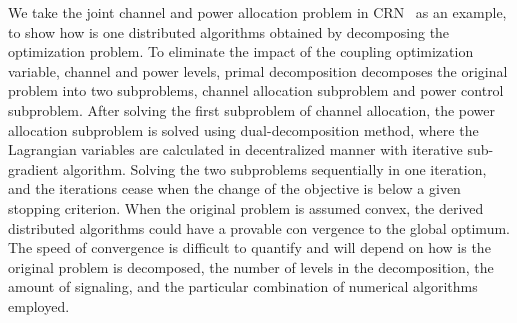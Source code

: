 We take the joint channel and power allocation problem in CRN~\cite{tachwali_opt_bandwidth_power_2013} as an example, to show how is one distributed algorithms obtained by decomposing the optimization problem.
To eliminate the impact of the coupling optimization variable, \ie channel and power levels, primal decomposition decomposes the original problem into two subproblems, channel allocation subproblem and power control subproblem. 
After solving the first subproblem of channel allocation, the power allocation subproblem is solved using dual-decomposition method, where the Lagrangian variables are calculated in decentralized manner with iterative sub-gradient algorithm.
Solving the two subproblems sequentially in one iteration, and the iterations cease when the change of the objective is below a given stopping criterion.
When the original problem is assumed convex, the derived distributed algorithms could have a provable con vergence to the global optimum.
The speed of convergence is difficult to quantify and will depend on how is the original problem is decomposed, \ie the number of levels in the decomposition, the amount of signaling, and the particular combination of numerical algorithms employed.






%

